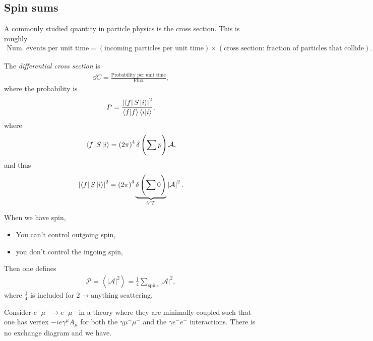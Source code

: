 \subsection{Spin sums}

A commonly studied quantity in particle physics is the cross section. This is roughly
\begin{align}
    \text{Num. events per unit time} = \left( \text{incoming particles per unit time} \right) \times  \left( \text{cross section: fraction of particles that collide} \right) 
.\end{align}

The \textit{differential cross section} is
\begin{align}
    \dd{C} = \frac{\text{Probability per unit time}}{\text{Flux}}
,\end{align}
where the probability is
\begin{align}
    P = \frac{\left| \bra{f} S \ket{i} \right|^2}{\bra{f} \ket{f} \bra{i} \ket{i}}
,\end{align}
where
\begin{align}
    \bra{f} S \ket{i} = \left( 2\pi \right)^{4} \delta \left( \sum_{}^{} p \right) \mathcal{A}
,\end{align}
and thus
\begin{align}
    \left| \bra{f} S \ket{i} \right|^2 = \left( 2\pi \right)^{4} \underbrace{\delta \left( \sum_{}^{} 0 \right)}_{V T} \left| \mathcal{A} \right|^2
.\end{align}

When we have spin,
\begin{itemize}
    \item You can't control outgoing spin,
    \item you don't control the ingoing spin,
\end{itemize}

Then one defines
\begin{align}
    \mathcal{P} = \left< \left| \mathcal{A} \right|^2 \right> = \frac{1}{4}\sum_{\text{spins}}^{} \left| \mathcal{A} \right|^2
,\end{align}
where $\frac{1}{4}$ is included for $2 \to \text{anything}$ scattering.

\begin{example}
    Consider $e^{-} \mu^{-} \to e^{-} \mu^{-}$ in a theory where they are minimally coupled such that one has vertex $-ie \gamma^{\mu} A_\mu$ for both the $\gamma \mu^{-} \mu^{-}$ and the $\gamma e^{-} e^{-}$ interactions. There is no exchange diagram and we have.
\end{example}

